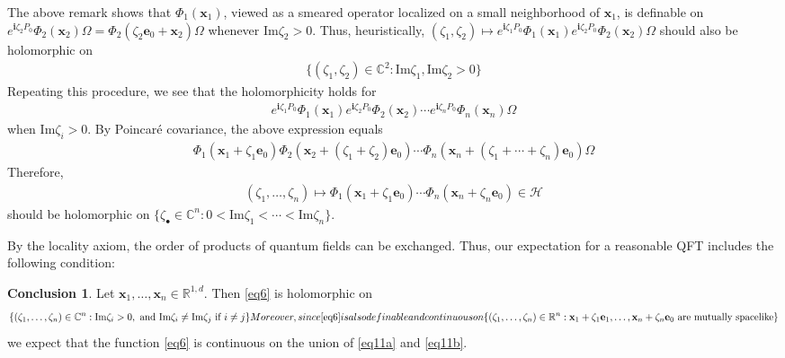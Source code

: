 \documentclass[12pt,b5paper,notitlepage]{article}
\theoremstyle{definition}
\newtheorem{concl}[df]{Conclusion}
\theoremstyle{plain}
\newcommand{\mc}{\mathcal}
\newcommand{\im}{\mathbf{i}}
\newcommand{\blt}{\bullet}
\newcommand{\Cbb}{\mathbb C}
\newcommand{\Rbb}{\mathbb R}
\newcommand{\Imag}{\mathrm{Im}}
\newcommand{\xbf}{\mathbf x}
\newcommand{\ebf}{\mathbf e}
\numberwithin{equation}{section}
\begin{document}
The above remark shows that $\Phi_1(\xbf_1)$, viewed as a smeared operator localized on a small neighborhood of $\xbf_1$, is definable on $e^{\im\zeta_2P_0}\Phi_2(\xbf_2)\Omega=\Phi_2(\zeta_2\ebf_0+\xbf_2)\Omega$ whenever $\Imag\zeta_2>0$. Thus, heuristically, $(\zeta_1,\zeta_2)\mapsto e^{\im\zeta_1P_0}\Phi_1(\xbf_1)e^{\im\zeta_2P_0}\Phi_2(\xbf_2)\Omega$ should also be holomorphic on
\begin{align*}
\{(\zeta_1,\zeta_2)\in\Cbb^2:\Imag\zeta_1,\Imag\zeta_2>0\}
\end{align*}
Repeating this procedure, we see that the holomorphicity holds for
\begin{align*}
e^{\im\zeta_1 P_0}\Phi_1(\xbf_1)e^{\im\zeta_2P_0}\Phi_2(\xbf_2)\cdots e^{\im\zeta_nP_0}\Phi_n(\xbf_n)\Omega
\end{align*}
when $\Imag\zeta_i>0$. By Poincar\'e covariance, the above expression equals
\begin{align*}
\Phi_1(\xbf_1+\zeta_1\ebf_0)\Phi_2(\xbf_2+(\zeta_1+\zeta_2)\ebf_0)\cdots\Phi_n(\xbf_n+(\zeta_1+\cdots+\zeta_n)\ebf_0)\Omega
\end{align*}
Therefore,
\begin{align}\label{eq6}
(\zeta_1,\dots,\zeta_n)\mapsto \Phi_1(\xbf_1+\zeta_1\ebf_0)\cdots\Phi_n(\xbf_n+\zeta_n\ebf_0)\in\mc H
\end{align}
should be holomorphic on $\{\zeta_\blt\in\Cbb^n:0<\Imag\zeta_1<\cdots<\Imag\zeta_n\}$.

By the locality axiom, the order of products of quantum fields can be exchanged. Thus, our expectation for a reasonable QFT includes the following condition:
\begin{concl}
Let $\xbf_1,\dots,\xbf_n\in\Rbb^{1,d}$. Then \eqref{eq6} is holomorphic on
\begin{subequations}\label{eq11}
\begin{align}\label{eq11a}
\{(\zeta_1,\dots,\zeta_n)\in\Cbb^n:\Imag\zeta_i>0,\text{ and }\Imag\zeta_i\neq\Imag\zeta_j\text{ if }i\neq j\}
\end{align}
Moreover, since \eqref{eq6} is also definable and continuous on
\begin{align}\label{eq11b}
\{(\zeta_1,\dots,\zeta_n)\in\Rbb^n:\text{$\xbf_1+\zeta_1\ebf_1,\dots,\xbf_n+\zeta_n\ebf_0$ are mutually spacelike}\}
\end{align}
\end{subequations}
we expect that the function \eqref{eq6} is continuous on the union of \eqref{eq11a} and \eqref{eq11b}.
\end{concl}
\end{document}

